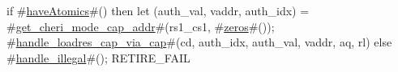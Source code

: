 if #\hyperref[sailRISCVzhaveAtomics]{haveAtomics}#() then {
  let (auth_val, vaddr, auth_idx) = #\hyperref[sailRISCVzgetzycherizymodezycapzyaddr]{get\_cheri\_mode\_cap\_addr}#(rs1_cs1, #\hyperref[sailRISCVzzzeros]{zeros}#());
  #\hyperref[sailRISCVzhandlezyloadreszycapzyviazycap]{handle\_loadres\_cap\_via\_cap}#(cd, auth_idx, auth_val, vaddr, aq, rl)
} else {
  #\hyperref[sailRISCVzhandlezyillegal]{handle\_illegal}#();
  RETIRE_FAIL
}
